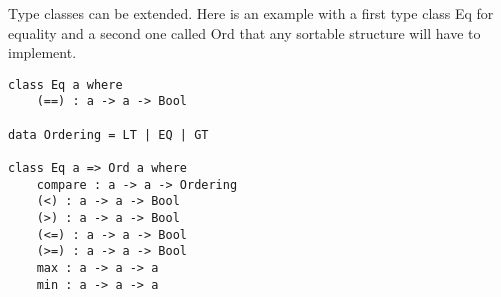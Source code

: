 Type classes can be extended. Here is an example with a first type class Eq for equality and a second one called Ord that any sortable structure will have to implement.

\begin{lstlisting}[caption=extension of typeclass, captionpos=b, label=lst8:haskell2]
class Eq a where
	(==) : a -> a -> Bool

data Ordering = LT | EQ | GT

class Eq a => Ord a where
	compare : a -> a -> Ordering
	(<) : a -> a -> Bool
	(>) : a -> a -> Bool
	(<=) : a -> a -> Bool
	(>=) : a -> a -> Bool
	max : a -> a -> a
	min : a -> a -> a
\end{lstlisting}